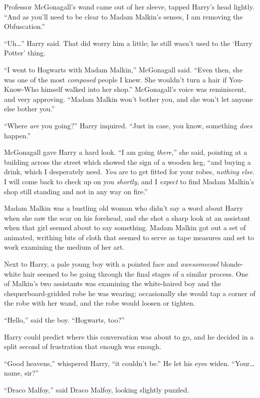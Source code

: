 Professor McGonagall’s wand came out of her sleeve, tapped Harry’s head lightly.
“And as you’ll need to be clear to Madam Malkin’s senses, I am removing the Obfuscation.”

“Uh…” Harry said. That did worry him a little; he still wasn’t used to the ‘Harry Potter’ thing.

“I went to Hogwarts with Madam Malkin,” McGonagall said.
“Even then, she was one of the most \emph{composed} people I knew. She wouldn’t turn a hair if You-Know-Who himself walked into her shop.” McGonagall’s voice was reminiscent, and very approving.
“Madam Malkin won’t bother you, and she won’t let anyone else bother you.”

“Where \emph{are} you going?” Harry inquired.
“Just in case, you know, something \emph{does} happen.”

McGonagall gave Harry a hard look.
“I am going \emph{there},” she said, pointing at a building across the street which showed the sign of a wooden keg, “and buying a drink, which I desperately need. \emph{You} are to get fitted for your robes, \emph{nothing else}. I will come back to check up on you \emph{shortly}, and I \emph{expect} to find Madam Malkin’s shop still standing and not in any way on fire.”

Madam Malkin was a bustling old woman who didn’t say a word about Harry when she saw the scar on his forehead, and she shot a sharp look at an assistant when that girl seemed about to say something. Madam Malkin got out a set of animated, writhing bits of cloth that seemed to serve as tape measures and set to work examining the medium of her art.

Next to Harry, a pale young boy with a pointed face and \emph{awesomecool} blonde-white hair seemed to be going through the final stages of a similar process. One of Malkin’s two assistants was examining the white-haired boy and the chequerboard-gridded robe he was wearing; occasionally she would tap a corner of the robe with her wand, and the robe would loosen or tighten.

“Hello,” said the boy.
“Hogwarts, too?”

Harry could predict where this conversation was about to go, and he decided in a split second of frustration that enough was enough.

“Good heavens,” whispered Harry, “it couldn’t be.” He let his eyes widen.
“Your…name, sir?”

“Draco Malfoy,” said Draco Malfoy, looking slightly puzzled.

